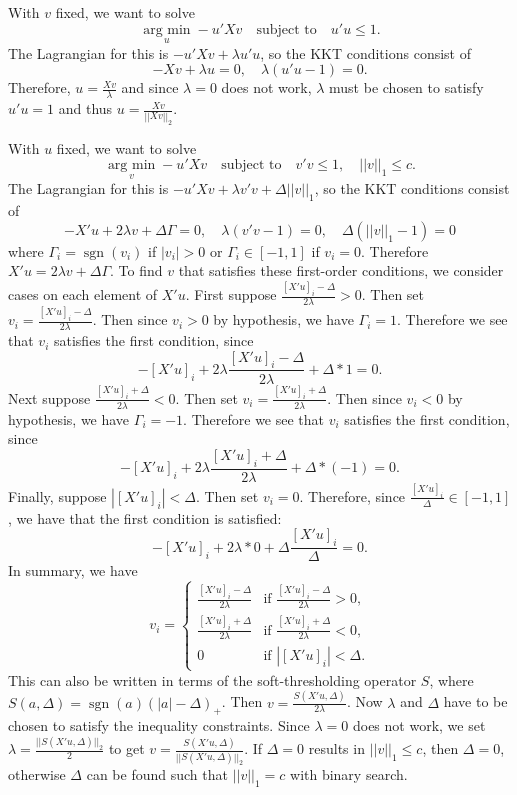 \documentclass[11pt]{article}
\newcommand{\argmin}{\operatorname*{arg \ min}}
\newcommand{\sgn}{\operatorname*{sgn}}
\begin{document}
With $v$ fixed, we want to solve
$$
\argmin_{u} -u'Xv \quad \text{subject to} \quad u'u \leq 1.
$$
The Lagrangian for this is $-u'Xv + \lambda u'u$, so the KKT conditions consist of 
$$ 
-Xv + \lambda u = 0, \quad \lambda(u'u - 1) = 0.
$$
Therefore, $u = \frac{Xv}{\lambda}$ and since $\lambda = 0$ does not work, $\lambda$ must be chosen to satisfy $u'u = 1$ and thus $u = \frac{Xv}{||Xv||_2}$. 

With $u$ fixed, we want to solve 
$$
\argmin_{v} -u'Xv \quad \text{subject to} \quad v'v \leq 1, \quad ||v||_1 \leq c.
$$
The Lagrangian for this is $-u'Xv + \lambda v'v + \Delta ||v||_1$, so the KKT conditions consist of 
$$
-X'u + 2\lambda v + \Delta \Gamma = 0, \quad \lambda(v'v - 1) = 0, \quad \Delta(||v||_1 - 1) = 0
$$
where $\Gamma_i = \sgn(v_i)$ if $|v_i| > 0$ or $\Gamma_i \in \left[-1, 1\right]$ if $v_i = 0$. Therefore $X'u = 2\lambda v + \Delta \Gamma$. To find $v$ that satisfies these first-order conditions, we consider cases on each element of $X'u$. First suppose $\frac{\left[X'u\right]_i - \Delta}{2\lambda} > 0$. Then set $v_i = \frac{\left[X'u\right]_i - \Delta}{2\lambda}$. Then since $v_i > 0$ by hypothesis, we have $\Gamma_i = 1$. Therefore we see that $v_i$ satisfies the first condition, since
$$
-\left[X'u\right]_i + 2\lambda \frac{\left[X'u\right]_i - \Delta}{2\lambda} + \Delta * 1 = 0.
$$
Next suppose $\frac{\left[X'u\right]_i + \Delta}{2\lambda} < 0$. Then set $v_i = \frac{\left[X'u\right]_i + \Delta}{2\lambda}$. Then since $v_i < 0$ by hypothesis, we have $\Gamma_i = -1$. Therefore we see that $v_i$ satisfies the first condition, since
$$
-\left[X'u\right]_i + 2\lambda \frac{\left[X'u\right]_i + \Delta}{2\lambda} + \Delta * (-1) = 0.
$$
Finally, suppose $\left|\left[X'u\right]_i\right| < \Delta$. Then set $v_i = 0$. Therefore, since $\frac{\left[X'u\right]_i}{\Delta} \in \left[-1, 1\right]$, we have that the first condition is satisfied:
$$
-\left[X'u\right]_i + 2\lambda * 0 + \Delta \frac{\left[X'u\right]_i}{\Delta} = 0.
$$
In summary, we have
$$
v_i = \begin{cases}
\frac{\left[X'u\right]_i - \Delta}{2\lambda} & \text{if } \frac{\left[X'u\right]_i - \Delta}{2\lambda} > 0, \\
\frac{\left[X'u\right]_i + \Delta}{2\lambda} & \text{if } \frac{\left[X'u\right]_i + \Delta}{2\lambda} < 0, \\
0 & \text{if } \left|\left[X'u\right]_i\right| < \Delta.
\end{cases}
$$
This can also be written in terms of the soft-thresholding operator $S$, where $S(a, \Delta) = \sgn(a)(|a| - \Delta)_{+}$. Then $v = \frac{S(X'u, \Delta)}{2\lambda}$. 
Now $\lambda$ and $\Delta$ have to be chosen to satisfy the inequality constraints. Since $\lambda = 0$ does not work, we set $\lambda = \frac{||S(X'u, \Delta)||_2}{2}$ to get $v = \frac{S(X'u, \Delta)}{||S(X'u, \Delta)||_2}$. If $\Delta = 0$ results in $||v||_1 \leq c$, then $\Delta = 0$, otherwise $\Delta$ can be found such that $||v||_1 = c$ with binary search. 
\end{document}
